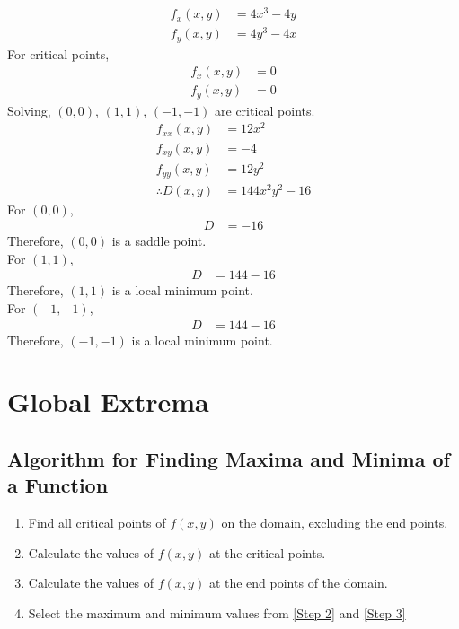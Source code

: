 \documentclass[fleqn, a4paper, 12pt, twoside]{article}
\theoremstyle{definition}
\theoremstyle{theorem}
\begin{document}
{\begin{solution}
	\begin{align*}
		f_x(x,y) & = 4x^3 - 4y \\
		f_y(x,y) & = 4y^3 - 4x
	\end{align*}
	For critical points,
	\begin{align*}
		f_x(x,y) & = 0 \\
		f_y(x,y) & = 0
	\end{align*}
	Solving, $(0,0)$, $(1,1)$, $(-1,-1)$ are critical points.
	\begin{align*}
		f_{xx}(x,y)       & = 12x^2 \\
		f_{xy}(x,y)       & = -4    \\
		f_{yy}(x,y)       & = 12y^2 \\
		\therefore D(x,y) & = 144 x^2 y^2 - 16
	\end{align*}
	For $(0,0)$,
	\begin{align*}
		D & = -16
	\end{align*}
	Therefore, $(0,0)$ is a saddle point.\\
	For $(1,1)$,
	\begin{align*}
		D & = 144-16
	\end{align*}
	Therefore, $(1,1)$ is a local minimum point.\\
	For $(-1,-1)$,
	\begin{align*}
		D & = 144-16
	\end{align*}
	Therefore, $(-1,-1)$ is a local minimum point.\\
\end{solution}

\section{Global Extrema}

\subsection{Algorithm for Finding Maxima and Minima of a Function}

\begin{enumerate}[label = Step \arabic*]
	\item Find all critical points of $f(x,y)$ on the domain, excluding the end points. \label{Step 1}
	\item Calculate the values of $f(x,y)$ at the critical points. \label{Step 2}
	\item Calculate the values of $f(x,y)$ at the end points of the domain. \label{Step 3}
	\item Select the maximum and minimum values from \ref{Step 2} and \ref{Step 3}
\end{enumerate}

}
\end{document}
